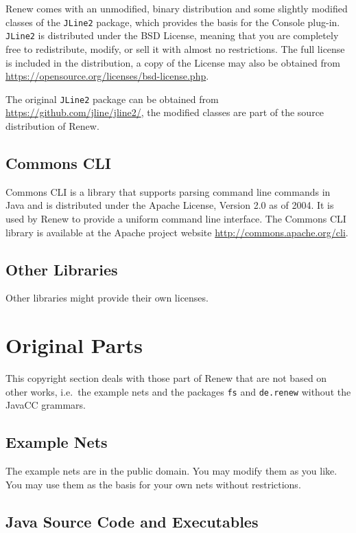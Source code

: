 Renew comes with an unmodified, binary distribution and some slightly
modified classes of the \texttt{JLine2} package, which provides the
basis for the Console plug-in.  \texttt{JLine2} is distributed under
the BSD License, meaning that you are completely free to redistribute,
modify, or sell it with almost no restrictions.  The full license is
included in the distribution, a copy of the License may also be
obtained from \url{https://opensource.org/licenses/bsd-license.php}.

The original \texttt{JLine2} package can be obtained from
\url{https://github.com/jline/jline2/}, the modified classes are part
of the source distribution of Renew.

\subsection{Commons CLI}

Commons CLI is a library that supports parsing command line commands
in Java and is distributed under the Apache License, Version 2.0 as of
2004. It is used by Renew to provide a uniform command line interface. 
The Commons CLI library is available at the Apache project website 
\url{http://commons.apache.org/cli}.

\subsection{Other Libraries}
\label{sec:other-libraries}

Other libraries might provide their own licenses. 

\section{Original Parts}
\label{sec:license-original-parts}%

This copyright section deals with those part of Renew that are not
based on other works, i.e.\ the example nets and the packages
\texttt{fs} and \texttt{de.renew} without the JavaCC grammars.

\subsection{Example Nets}

The example nets are in the public domain. You may modify them as
you like. You may use them as the basis for your own nets without
restrictions.

\subsection{Java Source Code and Executables}

